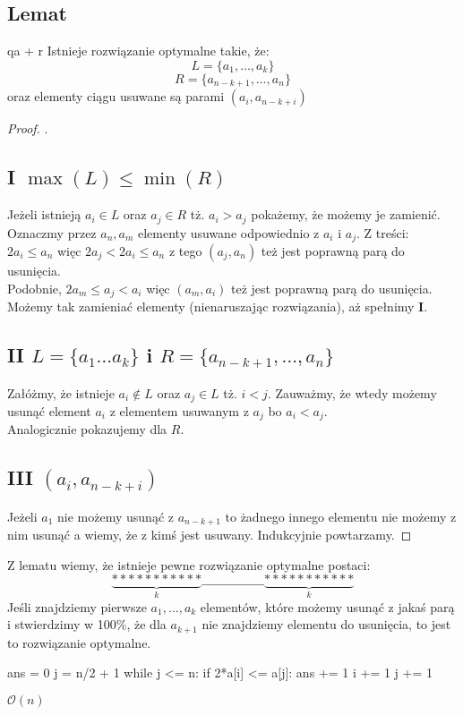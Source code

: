 \documentclass{article}
\begin{document}
\subsection*{Lemat}qa + r
Istnieje rozwiązanie optymalne takie, że:
$$L = \{a_1, \ldots, a_k\}$$
$$R = \{a_{n-k+1}, \ldots, a_n\}$$
oraz elementy ciągu usuwane są parami $(a_i, a_{n-k+i})$
\begin{proof}.
\subsection*{I \quad $\max(L) \leq \min(R)$}
Jeżeli istnieją $a_i \in L$ oraz $a_j \in R$ tż. $a_i > a_j$ pokażemy, że możemy je zamienić. Oznaczmy przez $a_n, a_m$ elementy usuwane odpowiednio z $a_i$ i $a_j$. Z treści:\\
$2a_i \leq a_n$ więc $2a_j < 2a_i \leq a_n$ z tego $(a_j, a_n)$ też jest poprawną parą do usunięcia.\\
Podobnie, $2a_m \leq a_j < a_i$ więc $(a_m, a_i)$ też jest poprawną parą do usunięcia.\\
Możemy tak zamieniać elementy (nienaruszając rozwiązania), aż spełnimy \textbf{I}.
\subsection*{II \quad $L = \{a_1 \ldots a_k\}$ i $R = \{a_{n-k+1}, \ldots, a_n\}$}
Załóżmy, że istnieje $a_i \notin L$ oraz $a_j \in L$ tż. $i < j$.
Zauważmy, że wtedy możemy usunąć element $a_i$ z elementem usuwanym z $a_j$ bo $a_i < a_j$.\\
Analogicznie pokazujemy dla $R$.
\subsection*{III \quad $(a_i, a_{n-k+i})$}
Jeżeli $a_1$ nie możemy usunąć z $a_{n-k+1}$ to żadnego innego elementu nie możemy z nim usunąć a wiemy, że z kimś jest usuwany. Indukcyjnie powtarzamy.
\end{proof}
Z lematu wiemy, że istnieje pewne rozwiązanie optymalne postaci:\\
$$
\underbrace{***********}_k\_\_\_\_\_\_\_\_\_\_\_\_\_\_\_\underbrace{***********}_k
$$
Jeśli znajdziemy pierwsze $a_1,\ldots,a_k$ elementów, które możemy usunąć z jakaś parą i stwierdzimy w 100\%, że dla $a_{k+1}$ nie znajdziemy elementu do usunięcia, to jest to rozwiązanie optymalne.
\begin{python}
ans = 0
j = n/2 + 1
while j <= n:
    if 2*a[i] <= a[j]:
        ans += 1
        i += 1
    j += 1
\end{python}
$\mathcal{O}(n)$
\end{document}
